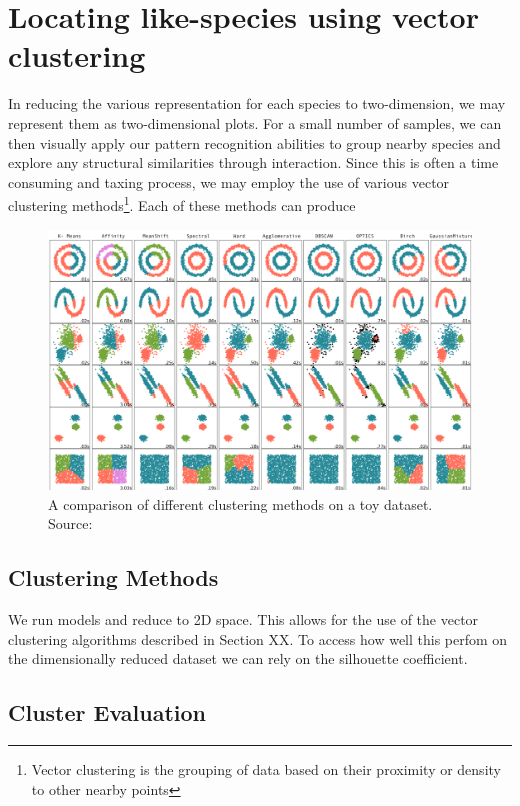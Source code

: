 
\section{Locating like-species using vector clustering}
In reducing the various representation for each species to two-dimension, we may represent them as two-dimensional plots. For a small number of samples, we can then visually apply our pattern recognition abilities to group nearby species and explore any structural similarities through interaction. Since this is often a time consuming and taxing process, we may employ the use of various vector clustering methods\footnote{Vector clustering is the grouping of data based on their proximity or density to other nearby points}.  Each of these methods can produce

\begin{figure}[H]
     \centering

         \includegraphics[width=\textwidth]{4fig/clustereval.png}

        \caption{A comparison of different clustering methods on a toy dataset. Source: \cite{clustereval}}
        \label{fig:clustereval}
\end{figure}

\subsection{Clustering Methods}


We run models and reduce to 2D space. This allows for the use of the vector clustering algorithms described in Section XX. To access how well this perfom on the dimensionally reduced dataset we can rely on the silhouette coefficient.

\subsection{Cluster Evaluation}


